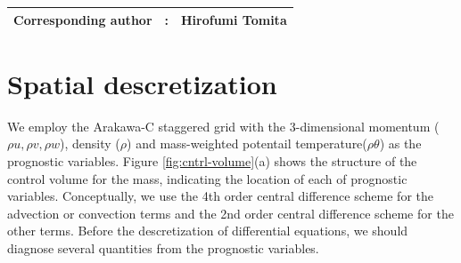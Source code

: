 {\bf \Large
\begin{tabular}{ccc}
\hline
  Corresponding author & : & Hirofumi Tomita\\
\hline
\end{tabular}
}

\section{Spatial descretization}
We employ the Arakawa-C staggered grid with the 3-dimensional momentum
($\rho u, \rho v, \rho w$), density ($\rho$) and mass-weighted potentail temperature($\rho \theta$)
as the prognostic variables.
Figure \ref{fig:cntrl-volume}(a) shows the structure of the control volume for the mass,
indicating the location of each of prognostic variables.
Conceptually, we use the 4th order central difference scheme
for the advection or convection terms and
the 2nd order central difference scheme for the other terms.
Before the descretization of differential equations,
we should diagnose several quantities from the prognostic variables.
